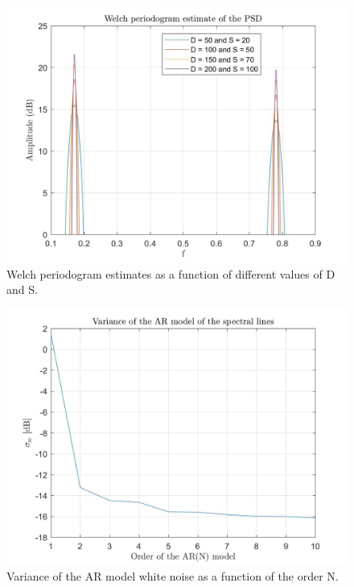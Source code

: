 \documentclass[a4paper,11pt,openright,twoside]{report}
\begin{document}
\begin{figure}
	\centering
	\includegraphics[width=14cm]{images/Welch_vs_SD_2.jpg}
	\caption{Welch periodogram estimates as a function of different values of D and S.}\label{WelchSD_2}
\end{figure}	
\begin{figure}[h]
	\centering
	\includegraphics[width=14cm]{images/sigma_vs_N_2.jpg}
	\caption{Variance of the AR model white noise as a function of the order N.}\label{sigmavsN_2}
\end{figure}	
\end{document}
